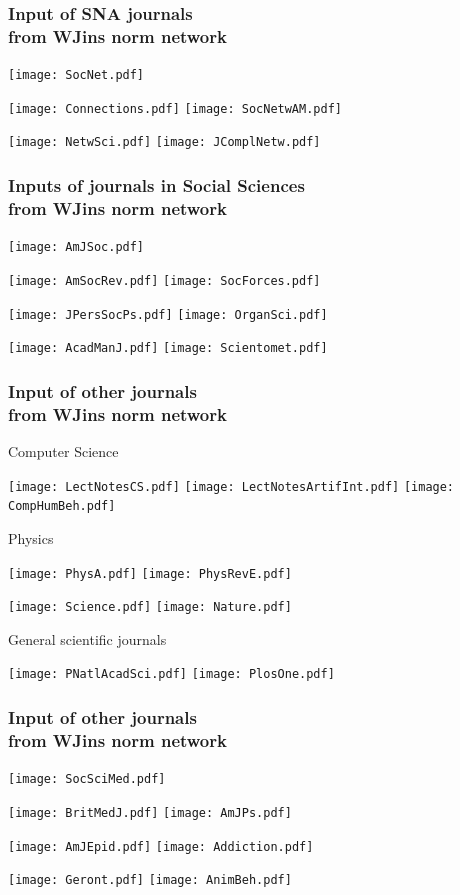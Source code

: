 \documentclass[hyperref={pdfstartview={FitBH -32768},
                         pdfpagemode=FullScreen,
                         plainpages=false,
                         colorlinks=true}
              ]{beamer}
\begin{document}
\begin{frame}[fragile]
\frametitle{Input of SNA journals \\ \normalsize from WJins norm network }
\centerline{
\texttt{[image: SocNet.pdf]} }
\centerline{
\texttt{[image: Connections.pdf]} 
\texttt{[image: SocNetwAM.pdf]}}
\centerline{
\texttt{[image: NetwSci.pdf]} 
\texttt{[image: JComplNetw.pdf]}}

\end{frame}     

\begin{frame}[fragile]
\frametitle{Inputs of journals in Social Sciences \\ \normalsize from WJins norm network }
\centerline{
\texttt{[image: AmJSoc.pdf]}}  
\centerline{
\texttt{[image: AmSocRev.pdf]} 
\texttt{[image: SocForces.pdf]}} 
\centerline{
\texttt{[image: JPersSocPs.pdf]} 
\texttt{[image: OrganSci.pdf]}} 
\centerline{
\texttt{[image: AcadManJ.pdf]} 
\texttt{[image: Scientomet.pdf]}} 
\end{frame}

\begin{frame}[fragile]
\frametitle{Input of other journals \\ \normalsize from WJins norm network }
\footnotesize
Computer Science \medskip 
\centerline{
\texttt{[image: LectNotesCS.pdf]} 
\texttt{[image: LectNotesArtifInt.pdf]}
\texttt{[image: CompHumBeh.pdf]}}
Physics  \medskip 
\centerline{
\texttt{[image: PhysA.pdf]} 
\texttt{[image: PhysRevE.pdf]}}
\centerline{
\texttt{[image: Science.pdf]} 
\texttt{[image: Nature.pdf]}}
General scientific journals \medskip 
\centerline{
\texttt{[image: PNatlAcadSci.pdf]} 
\texttt{[image: PlosOne.pdf]}}
\end{frame}


\begin{frame}[fragile]
\frametitle{Input of other journals \\ \normalsize from WJins norm network }
\centerline{
\texttt{[image: SocSciMed.pdf]}}
\centerline{
\texttt{[image: BritMedJ.pdf]} \qquad
\texttt{[image: AmJPs.pdf]}}
\centerline{
\texttt{[image: AmJEpid.pdf]} \qquad
\texttt{[image: Addiction.pdf]}} 
\centerline{
\texttt{[image: Geront.pdf]} \qquad
\texttt{[image: AnimBeh.pdf]}} 
\end{frame}
\end{document}
